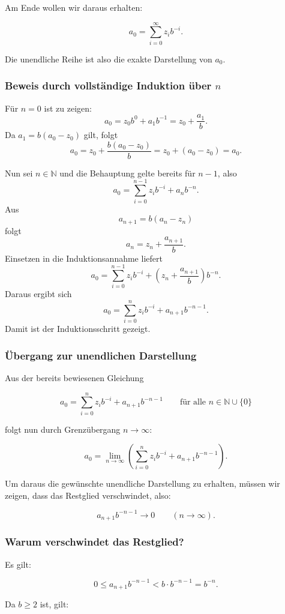 \documentclass{article}
\newcommand{\N}{\mathbb{N}}
\begin{document}
Am Ende wollen wir daraus erhalten:

\[
a_0=\sum_{i=0}^{\infty} z_i b^{-i}.
\]

Die unendliche Reihe ist also die exakte Darstellung von \(a_0\).

\subsubsection*{Beweis durch vollständige Induktion über \(n\)}

Für \(n=0\) ist zu zeigen:
\[
a_0=z_0b^0+a_1b^{-1}=z_0+\frac{a_1}{b}.
\]
Da \(a_1=b(a_0-z_0)\) gilt, folgt
\[
a_0=z_0+\frac{b(a_0-z_0)}{b}=z_0+(a_0-z_0)=a_0.
\]

Nun sei \(n\in\N\) und die Behauptung gelte bereits für \(n-1\), also
\[
a_0=
\sum_{i=0}^{n-1} z_i b^{-i}
+
a_n b^{-n}.
\]
Aus
\[
a_{n+1}=b(a_n-z_n)
\]
folgt
\[
a_n=z_n+\frac{a_{n+1}}{b}.
\]
Einsetzen in die Induktionsannahme liefert
\[
a_0=
\sum_{i=0}^{n-1} z_i b^{-i}
+
\left(z_n+\frac{a_{n+1}}{b}\right)b^{-n}.
\]
Daraus ergibt sich
\[
a_0=
\sum_{i=0}^{n} z_i b^{-i}
+
a_{n+1}b^{-n-1}.
\]
Damit ist der Induktionsschritt gezeigt.

\subsubsection*{Übergang zur unendlichen Darstellung}

Aus der bereits bewiesenen Gleichung

\[
a_0=
\sum_{i=0}^{n} z_i b^{-i}
+
a_{n+1}b^{-n-1}
\qquad\text{für alle } n\in\mathbb{N}\cup\{0\}
\]

folgt nun durch Grenzübergang \(n\to\infty\):

\[
a_0=\lim_{n\to\infty}\left(\sum_{i=0}^{n} z_i b^{-i}+a_{n+1}b^{-n-1}\right).
\]

Um daraus die gewünschte unendliche Darstellung zu erhalten, müssen wir zeigen, dass das Restglied verschwindet, also:

\[
a_{n+1}b^{-n-1}\to 0
\qquad (n\to\infty).
\]


\subsubsection*{Warum verschwindet das Restglied?}

Es gilt:

\[
0\leq a_{n+1}b^{-n-1}<b\cdot b^{-n-1}=b^{-n}.
\]

Da \(b\geq 2\) ist, gilt:
\end{document}
